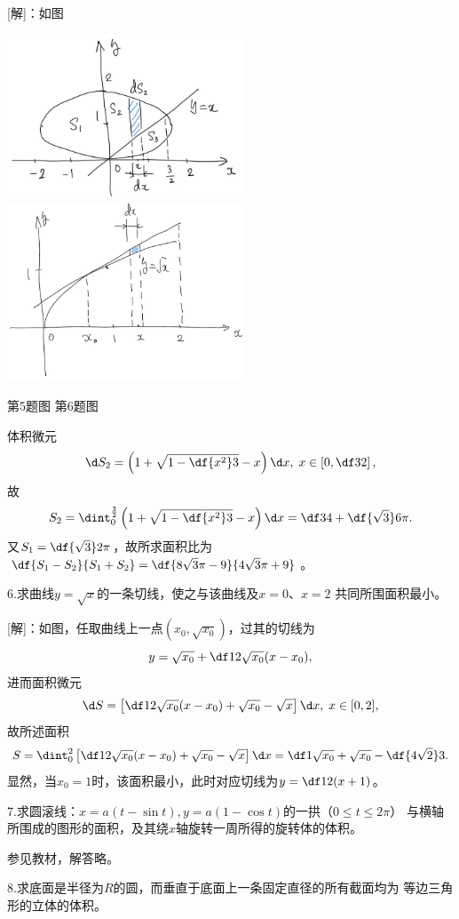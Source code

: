 [解]：如图
\begin{center}
	\includegraphics[width=7cm]{./images/ch6/ecXY.jpg}
	\includegraphics[width=7cm]{./images/ch6/ySqtXx.jpg}
	
	{\kaishu 第5题图\hspace{7cm} 第6题图}
\end{center}
体积微元
$$\d S_2=\left(1+\sqrt{1-\df{x^2}3}-x\right)\d x,\;x\in\left[0,\df32\right],$$
故
$$S_2=\dint_0^{\frac32}\left(1+\sqrt{1-\df{x^2}3}-x\right)\d x
=\df34+\df{\sqrt3}6\pi.$$
又$S_1=\df{\sqrt3}2\pi$，故所求面积比为$\df{S_1-S_2}{S_1+S_2}=\df{8\sqrt3\pi-9}
{4\sqrt3\pi+9}$。
\fin

6.求曲线$y=\sqrt x$的一条切线，使之与该曲线及$x=0$、$x=2$
共同所围面积最小。

[解]：如图，任取曲线上一点$(x_0,\sqrt{x_0})$，过其的切线为
$$y=\sqrt{x_0}+\df1{2\sqrt{x_0}}(x-x_0),$$
进而面积微元
$$\d S=\left[\df1{2\sqrt{x_0}}(x-x_0)+\sqrt{x_0}-\sqrt{x}\right]\d
x,\;x\in[0,2],$$ 故所述面积
$$S=\dint_0^2\left[\df1{2\sqrt{x_0}}(x-x_0)+\sqrt{x_0}-\sqrt{x}\right]\d
x=\df1{\sqrt{x_0}}+\sqrt{x_0}-\df{4\sqrt2}3.$$
显然，当$x_0=1$时，该面积最小，此时对应切线为$y=\df12(x+1)$。
\fin

\bs

7.求圆滚线：$x=a(t-\sin t),y=a(1-\cos t)$的一拱（$0\leq t\leq 2\pi$）
与横轴所围成的图形的面积，及其绕$x$轴旋转一周所得的旋转体的体积。

参见教材，解答略。

8.求底面是半径为$R$的圆，而垂直于底面上一条固定直径的所有截面均为
等边三角形的立体的体积。

